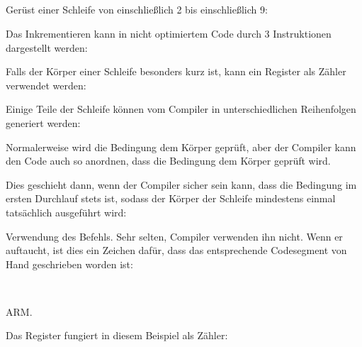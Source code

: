 \subsection{\Conclusion{}}

Gerüst einer Schleife von einschließlich 2 bis einschließlich 9:



Das Inkrementieren kann in nicht optimiertem Code durch 3 Instruktionen
dargestellt werden:



Falls der Körper einer Schleife besonders kurz ist, kann ein Register als Zähler
verwendet werden:



Einige Teile der Schleife können vom Compiler in unterschiedlichen Reihenfolgen
generiert werden:



Normalerweise wird die Bedingung  dem Körper geprüft, aber der Compiler
kann den Code auch so anordnen, dass die Bedingung  dem Körper geprüft
wird.

Dies geschieht dann, wenn der Compiler sicher sein kann, dass die Bedingung im
ersten Durchlauf stets  ist, sodass der Körper der Schleife mindestens
einmal tatsächlich ausgeführt wird:




Verwendung des  Befehls. Sehr selten, Compiler verwenden ihn nicht.
Wenn er auftaucht, ist dies ein Zeichen dafür, dass das entsprechende
Codesegment von Hand geschrieben worden ist:

　


ARM. 

Das  Register fungiert in diesem Beispiel als Zähler:

　


